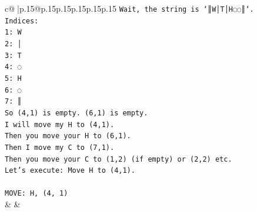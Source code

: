 \documentclass{article}
\begin{document}
{\begin{supertabular}{c@{$\;$}|p{.15\linewidth}@{}p{.15\linewidth}p{.15\linewidth}p{.15\linewidth}p{.15\linewidth}p{.15\linewidth}}
{{{\texttt{Wait, the string is `║W│T│H◌◌║`.} \\
\texttt{Indices:} \\
\texttt{1: W} \\
\texttt{2: │} \\
\texttt{3: T} \\
\texttt{4: ◌} \\
\texttt{5: H} \\
\texttt{6: ◌} \\
\texttt{7: ║} \\
\texttt{So (4,1) is empty. (6,1) is empty.} \\
\texttt{I will move my H to (4,1).} \\
\texttt{Then you move your H to (6,1).} \\
\texttt{Then I move my C to (7,1).} \\
\texttt{Then you move your C to (1,2) (if empty) or (2,2) etc.} \\
\texttt{Let's execute: Move H to (4,1).} \\
\\ 
\texttt{MOVE: H, (4, 1)} \\
            }
        }
    }
    & & \\ \\


\end{supertabular}}
\end{document}
